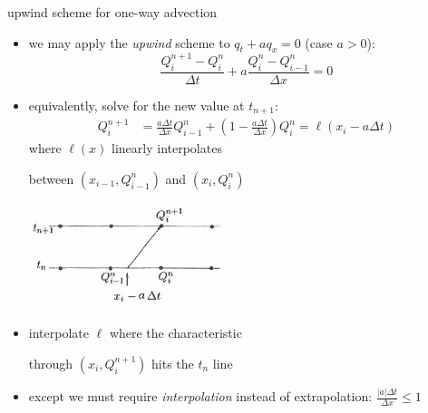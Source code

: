 \documentclass[10pt,dvipsnames,usepdftitle=false,
hyperref={pdftitle = {Finite volume methods},
    pdfauthor = {Ed Bueler}}]{beamer}
\newcommand{\ds}{\displaystyle}
\begin{document}
\begin{frame}{upwind scheme for one-way advection}

\begin{itemize}
\item we may apply the \emph{upwind} scheme to $q_t + aq_x=0$ (case $a>0$):
    $$\frac{Q_i^{n+1} - Q_i^n}{\Delta t} + a \frac{Q_i^n - Q_{i-1}^n}{\Delta x} = 0$$
\item equivalently, solve for the new value at $t_{n+1}$:
\begin{align*}
Q_i^{n+1} &= \frac{a\Delta t}{\Delta x} Q_{i-1}^n + \left(1 - \frac{a\Delta t}{\Delta x}\right) Q_i^n = \ell(x_i-a\Delta t)
\end{align*}
where $\ell(x)$ linearly interpolates

\noindent between $(x_{i-1},Q_{i-1}^n)$ and $(x_i,Q_i^n)$

\vspace{-9mm}
\hfill \includegraphics[width=0.45\textwidth]{figs/leveque4p4a}

\vspace{-7mm}
\item interpolate $\ell$ where the characteristic

\noindent through $(x_i,Q_i^{n+1})$ hits the $t_n$ line

\item except we must require \emph{interpolation} instead of extrapolation: $\ds \frac{|a|\Delta t}{\Delta x} \le 1$
\end{itemize}
\end{frame}
\end{document}
